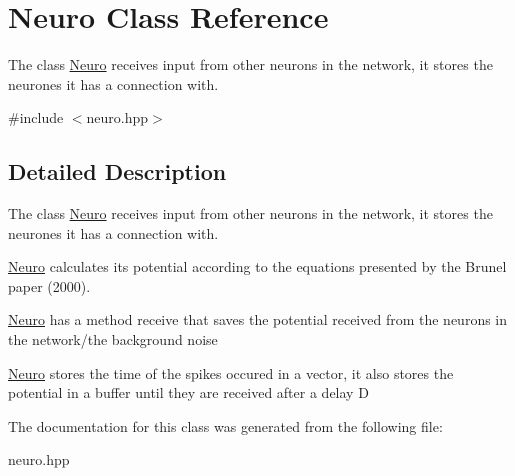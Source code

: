 \hypertarget{classNeuro}{\section{Neuro Class Reference}
\label{classNeuro}
}


The class \hyperlink{classNeuro}{Neuro} receives input from other neurons in the network, it stores the neurones it has a connection with.  




{\ttfamily \#include $<$neuro.\-hpp$>$}



\subsection{Detailed Description}
The class \hyperlink{classNeuro}{Neuro} receives input from other neurons in the network, it stores the neurones it has a connection with. 

\hyperlink{classNeuro}{Neuro} calculates its potential according to the equations presented by the Brunel paper (2000).

\hyperlink{classNeuro}{Neuro} has a method receive that saves the potential received from the neurons in the network/the background noise

\hyperlink{classNeuro}{Neuro} stores the time of the spikes occured in a vector, it also stores the potential in a buffer until they are received after a delay D 

The documentation for this class was generated from the following file\-:\begin{DoxyCompactItemize}
\item 
neuro.\-hpp\end{DoxyCompactItemize}
